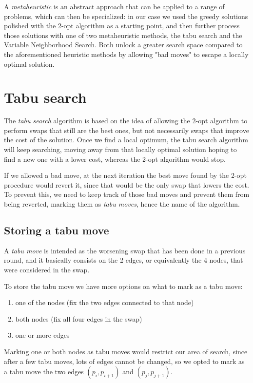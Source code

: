 A \textit{metaheuristic} is an abstract approach that can be applied to a range of problems, which can then be specialized: in our case we used the greedy solutions polished with the 2-opt algorithm as a starting point, and then further process those solutions with one of two metaheuristic methods, the tabu search and the Variable Neighborhood Search.
Both unlock a greater search space compared to the aforementioned heuristic methods by allowing "bad moves" to escape a locally optimal solution.

\section{Tabu search}
The \textit{tabu search} algorithm \cite{Glover1990} is based on the idea of allowing the 2-opt algorithm to perform swaps that still are the best ones, but not necessarily swaps that improve the cost of the solution. Once we find a local optimum, the tabu search algorithm will keep searching, moving away from that locally optimal solution hoping to find a new one with a lower cost, whereas the 2-opt algorithm would stop.

If we allowed a bad move, at the next iteration the best move found by the 2-opt procedure would revert it, since that would be the only swap that lowers the cost. To prevent this, we need to keep track of those bad moves and prevent them from being reverted, marking them as \textit{tabu moves}, hence the name of the algorithm.

\subsection{Storing a tabu move}

A \textit{tabu move} is intended as the worsening swap that has been done in a previous round, and it basically consists on the 2 edges, or equivalently the 4 nodes, that were considered in the swap.

To store the tabu move we have more options on what to mark as a tabu move:

\begin{enumerate}
    \item one of the nodes (fix the two edges connected to that node)
    \item both nodes (fix all four edges in the swap)
    \item one or more edges
\end{enumerate}

Marking one or both nodes as tabu moves would restrict our area of search, since after a few tabu moves, lots of edges cannot be changed, so we opted to mark as a tabu move the two edges $(p_{i},p_{i+1})$ and $(p_{j}, p_{j+1})$.

